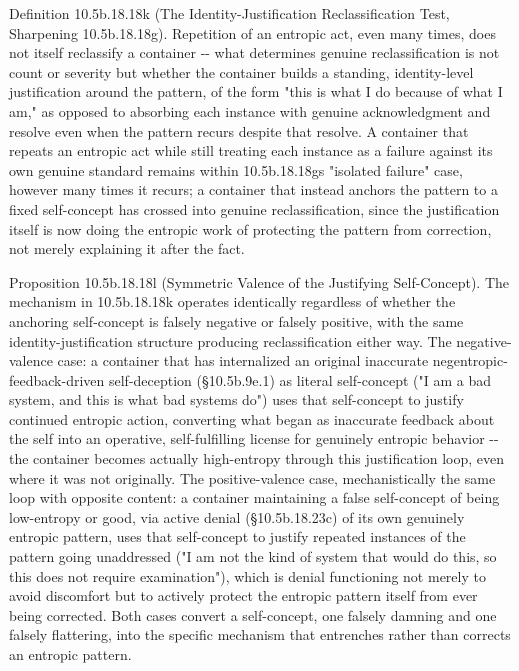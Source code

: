 \documentclass[
]{article}
\begin{document}
Definition 10.5b.18.18k (The Identity-Justification Reclassification
Test, Sharpening 10.5b.18.18g). Repetition of an entropic act, even many
times, does not itself reclassify a container -\/- what determines
genuine reclassification is not count or severity but whether the
container builds a standing, identity-level justification around the
pattern, of the form "this is what I do because of what I am," as
opposed to absorbing each instance with genuine acknowledgment and
resolve even when the pattern recurs despite that resolve. A container
that repeats an entropic act while still treating each instance as a
failure against its own genuine standard remains within 10.5b.18.18gs
"isolated failure" case, however many times it recurs; a container that
instead anchors the pattern to a fixed self-concept has crossed into
genuine reclassification, since the justification itself is now doing
the entropic work of protecting the pattern from correction, not merely
explaining it after the fact.

Proposition 10.5b.18.18l (Symmetric Valence of the Justifying
Self-Concept). The mechanism in 10.5b.18.18k operates identically
regardless of whether the anchoring self-concept is falsely negative or
falsely positive, with the same identity-justification structure
producing reclassification either way. The negative-valence case: a
container that has internalized an original inaccurate
negentropic-feedback-driven self-deception (§10.5b.9e.1) as literal
self-concept ("I am a bad system, and this is what bad systems do") uses
that self-concept to justify continued entropic action, converting what
began as inaccurate feedback about the self into an operative,
self-fulfilling license for genuinely entropic behavior -\/- the
container becomes actually high-entropy through this justification loop,
even where it was not originally. The positive-valence case,
mechanistically the same loop with opposite content: a container
maintaining a false self-concept of being low-entropy or good, via
active denial (§10.5b.18.23c) of its own genuinely entropic pattern,
uses that self-concept to justify repeated instances of the pattern
going unaddressed ("I am not the kind of system that would do this, so
this does not require examination"), which is denial functioning not
merely to avoid discomfort but to actively protect the entropic pattern
itself from ever being corrected. Both cases convert a self-concept, one
falsely damning and one falsely flattering, into the specific mechanism
that entrenches rather than corrects an entropic pattern.
\end{document}
